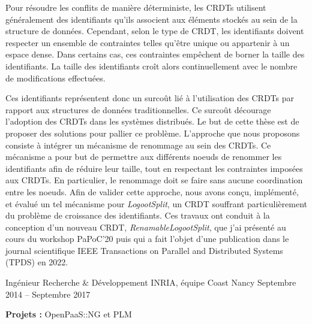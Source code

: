 \documentclass[12pt, a4paper]{awesome-cv}
\begin{document}
\begin{cventries}
\begin{cvparagraph}
  Pour résoudre les conflits de manière déterministe, les \acp{CRDT} utilisent généralement des identifiants qu'ils associent aux éléments stockés au sein de la structure de données.
  Cependant, selon le type de \ac{CRDT}, les identifiants doivent respecter un ensemble de contraintes telles qu'être unique ou appartenir à un espace dense.
  Dans certains cas, ces contraintes empêchent de borner la taille des identifiants.
  La taille des identifiants croît alors continuellement avec le nombre de modifications effectuées.

  Ces identifiants représentent donc un surcoût lié à l'utilisation des \acp{CRDT} par rapport aux structures de données traditionnelles.
  Ce surcoût décourage l'adoption des \acp{CRDT} dans les systèmes distribués.
  Le but de cette thèse est de proposer des solutions pour pallier ce problème.
  L'approche que nous proposons consiste à intégrer un mécanisme de renommage au sein des \acp{CRDT}.
  Ce mécanisme a pour but de permettre aux différents noeuds de renommer les identifiants afin de réduire leur taille, tout en respectant les contraintes imposées aux \acp{CRDT}.
  En particulier, le renommage doit se faire sans aucune coordination entre les noeuds.
  Afin de valider cette approche, nous avons conçu, implémenté, et évalué un tel mécanisme pour \emph{LogootSplit}, un \ac{CRDT} souffrant particulièrement du problème de croissance des identifiants.
  Ces travaux ont conduit à la conception d'un nouveau \ac{CRDT}, \emph{RenamableLogootSplit}, que j'ai présenté au cours du workshop PaPoC'20 puis qui a fait l'objet d'une publication dans le journal scientifique IEEE Transactions on Parallel and Distributed Systems (TPDS) en 2022.

  \begin{description}[labelindent=1.6em,itemsep=-0.3em]
    \item {}
    \item {}
    \item {}
  \end{description}
\end{cvparagraph}

\cventry
  {Ingénieur Recherche \& Développement} %
  {INRIA, équipe Coast} %
  {Nancy} %
  {Septembre 2014 – Septembre 2017} %
  {
    \begin{cvitems} %
      \item {\textbf{Projets :} OpenPaaS::NG et PLM}
    \end{cvitems}
  }


\end{cventries}
\end{document}
